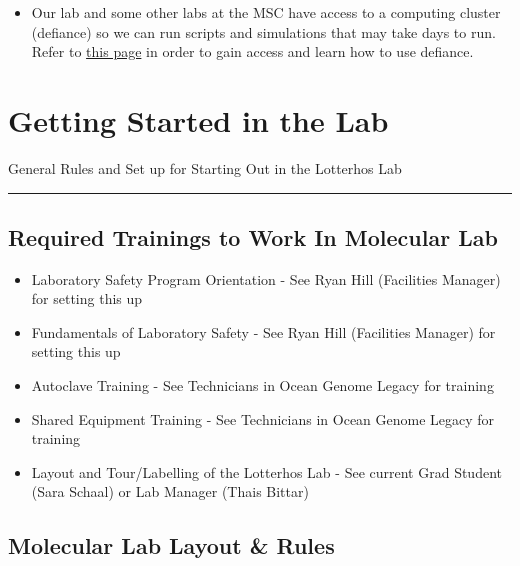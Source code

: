 \documentclass[
  letterpaper,
  DIV=11,
  numbers=noendperiod]{scrreprt}
\providecommand{\tightlist}{%
  \setlength{\itemsep}{0pt}\setlength{\parskip}{0pt}}\usepackage{longtable,booktabs,array}
\begin{document}
\begin{itemize}
\tightlist
\item
  Our lab and some other labs at the MSC have access to a computing
  cluster (defiance) so we can run scripts and simulations that may take
  days to run. Refer to
  \href{https://drk-lo.github.io/lotterhoslabprotocols/defiance/}{this
  page} in order to gain access and learn how to use defiance.
\end{itemize}

\hypertarget{getting-started-in-the-lab}{%
\chapter{Getting Started in the Lab}\label{getting-started-in-the-lab}}

General Rules and Set up for Starting Out in the Lotterhos Lab

\begin{center}\rule{0.5\linewidth}{0.5pt}\end{center}

\hypertarget{required-trainings-to-work-in-molecular-lab}{%
\section*{\texorpdfstring{\textbf{Required Trainings to Work In
Molecular
Lab}}{Required Trainings to Work In Molecular Lab}}\label{required-trainings-to-work-in-molecular-lab}}


\begin{itemize}
\item
  Laboratory Safety Program Orientation - See Ryan Hill (Facilities
  Manager) for setting this up
\item
  Fundamentals of Laboratory Safety - See Ryan Hill (Facilities Manager)
  for setting this up
\item
  Autoclave Training - See Technicians in Ocean Genome Legacy for
  training
\item
  Shared Equipment Training - See Technicians in Ocean Genome Legacy for
  training
\item
  Layout and Tour/Labelling of the Lotterhos Lab - See current Grad
  Student (Sara Schaal) or Lab Manager (Thais Bittar)
\end{itemize}

\hypertarget{molecular-lab-layout-rules}{%
\section*{\texorpdfstring{\textbf{Molecular Lab Layout \&
Rules}}{Molecular Lab Layout \& Rules}}\label{molecular-lab-layout-rules}}
\end{document}
